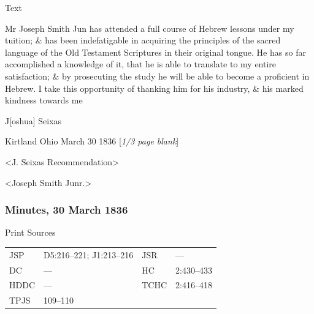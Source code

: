 				
				\begin{description}
					\item[Text]
				\end{description}
				
					Mr Joseph Smith Jun has attended a full course of Hebrew lessons under my tuition; \& has been indefatigable in acquiring the principles of the sacred language of the Old Testament Scriptures in their original tongue. He has so far accomplished a knowledge of it, that he is able to translate to my entire satisfaction; \& by prosecuting the study he will be able to become a proficient in Hebrew. I take this opportunity of thanking him for his industry, \& his marked kindness towards me
					
					\begin{tightright}
					J[oshua] Seixas
					\end{tightright}
					
					Kirtland Ohio March 30 1836 [\textit{1/3 page blank}]
					
					<J. Seixas Recommendation>
					
					<Joseph Smith Junr.>
					
		\subsubsection{Minutes, 30 March 1836}
			\label{EMS-1836-JS-30-MAR-1836-MIN}
			
			\begin{description}
					\item[Print Sources]
				\end{description}

					\begin{tabular}{p{0.5in}p{1in}p{0.5in}p{1in}}
					JSP	 	& D5:216--221; J1:213--216		& JSR 		& --- \\
					DC	 	& ---				& HC 		& 2:430--433 \\
					HDDC 	& ---				& TCHC 		& 2:416--418 \\
					TPJS 	& 109--110			& 	 		&  \\
					\end{tabular}
				
